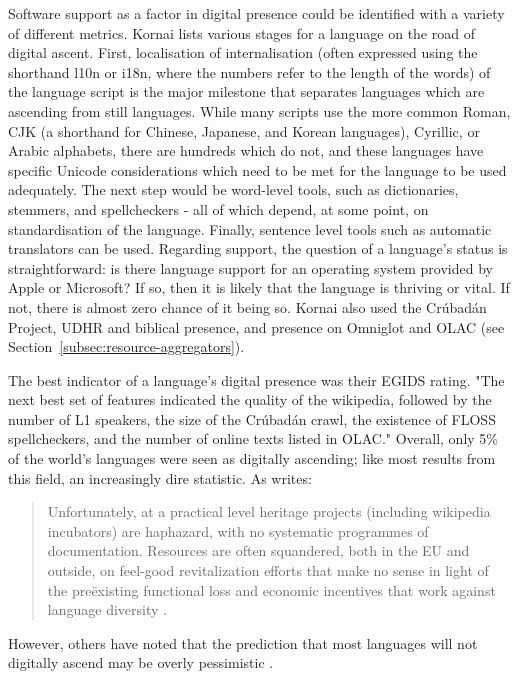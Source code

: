 Software support as a factor in digital presence could be identified with a variety of different metrics. Kornai lists various stages for a language on the road of digital ascent. First, localisation of internalisation (often expressed using the shorthand l10n or i18n, where the numbers refer to the length of the words) of the language script is the major milestone that separates languages which are ascending from still languages. While many scripts use the more common Roman, CJK (a shorthand for Chinese, Japanese, and Korean languages), Cyrillic, or Arabic alphabets, there are hundreds which do not, and these languages have specific Unicode considerations which need to be met for the language to be used adequately. The next step would be word-level tools, such as dictionaries, stemmers, and spellcheckers - all of which depend, at some point, on standardisation of the language. Finally, sentence level tools such as automatic translators can be used. Regarding support, the question of a language's status is straightforward: is there language support for an operating system provided by Apple or Microsoft? If so, then it is likely that the language is thriving or vital. If not, there is almost zero chance of it being so. Kornai also used the Cr\'ubad\'an Project, UDHR and biblical presence, and presence on Omniglot and OLAC (see Section~\ref{subsec:resource-aggregators}).

The best indicator of a language's digital presence was their EGIDS rating. "The next best set of features indicated the quality of the wikipedia, followed by the number of L1 speakers, the size of the Cr\'ubad\'an crawl, the existence of FLOSS spellcheckers, and the number of online texts listed in OLAC." \citep[6]{kornai2013digital} Overall, only 5\% of the world's languages were seen as digitally ascending; like most results from this field, an increasingly dire statistic. As \citet[10]{kornai2013digital} writes:

\begin{quote}
Unfortunately, at a practical level heritage projects (including wiki\-pedia incubators) are haphazard, with no systematic programmes of documentation. Resources are often squandered, both in the EU and outside, on feel-good revitalization efforts that make no sense in light of the pre\"{e}xisting functional loss and economic incentives that work against language diversity \citep{ginsburgh2011many}.
\end{quote}

However, others have noted that the prediction that most languages will not digitally ascend may be overly pessimistic \citep{gibson2016assessing}.


